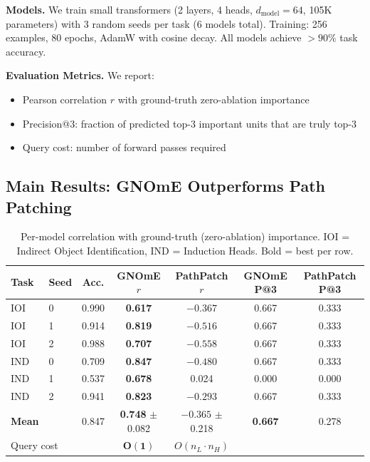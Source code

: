 \documentclass[11pt,a4paper]{article}
\begin{document}
\textbf{Models.} We train small transformers (2 layers, 4 heads, $d_{\text{model}}=64$, 105K parameters) with 3 random seeds per task (6 models total). Training: 256 examples, 80 epochs, AdamW with cosine decay. All models achieve $>90\%$ task accuracy.

\textbf{Evaluation Metrics.} We report:
\begin{itemize}[leftmargin=*]
    \item Pearson correlation $r$ with ground-truth zero-ablation importance
    \item Precision@3: fraction of predicted top-3 important units that are truly top-3
    \item Query cost: number of forward passes required
\end{itemize}

\subsection{Main Results: GNOmE Outperforms Path Patching}

\begin{table}[t]
\centering
\caption{Per-model correlation with ground-truth (zero-ablation) importance. IOI = Indirect Object Identification, IND = Induction Heads. Bold = best per row.}
\label{tab:main}
\begin{tabular}{llccccc}
\toprule
Task & Seed & Acc. & GNOmE $r$ & PathPatch $r$ & GNOmE P@3 & PathPatch P@3 \\
\midrule
IOI & 0 & 0.990 & \textbf{0.617} & $-0.367$ & 0.667 & 0.333 \\
IOI & 1 & 0.914 & \textbf{0.819} & $-0.516$ & 0.667 & 0.333 \\
IOI & 2 & 0.988 & \textbf{0.707} & $-0.558$ & 0.667 & 0.333 \\
IND & 0 & 0.709 & \textbf{0.847} & $-0.480$ & 0.667 & 0.333 \\
IND & 1 & 0.537 & \textbf{0.678} & 0.024  & 0.000 & 0.000 \\
IND & 2 & 0.941 & \textbf{0.823} & $-0.293$ & 0.667 & 0.333 \\
\midrule
\textbf{Mean} & & 0.847 & \textbf{0.748} $\pm$ 0.082 & $-0.365$ $\pm$ 0.218 & \textbf{0.667} & 0.278 \\
\midrule
\multicolumn{3}{l}{Query cost} & $\mathbf{O(1)}$ & $O(n_L \cdot n_H)$ & & \\
\bottomrule
\end{tabular}
\end{table}
\end{document}
